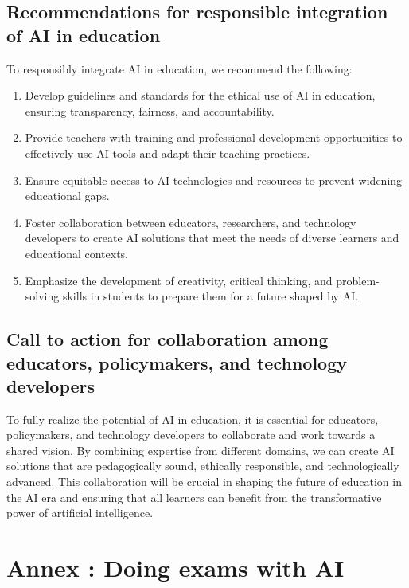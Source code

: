 \documentclass{article}
\begin{document}
\subsection{Recommendations for responsible integration of AI in education}
To responsibly integrate AI in education, we recommend the following:

\begin{enumerate}
    \item Develop guidelines and standards for the ethical use of AI in education, ensuring transparency, fairness, and accountability.
    \item Provide teachers with training and professional development opportunities to effectively use AI tools and adapt their teaching practices.
    \item Ensure equitable access to AI technologies and resources to prevent widening educational gaps.
    \item Foster collaboration between educators, researchers, and technology developers to create AI solutions that meet the needs of diverse learners and educational contexts.
    \item Emphasize the development of creativity, critical thinking, and problem-solving skills in students to prepare them for a future shaped by AI.
\end{enumerate}

\subsection{Call to action for collaboration among educators, policymakers, and technology developers}
To fully realize the potential of AI in education, it is essential for educators, policymakers, and technology developers to collaborate and work towards a shared vision. By combining expertise from different domains, we can create AI solutions that are pedagogically sound, ethically responsible, and technologically advanced. This collaboration will be crucial in shaping the future of education in the AI era and ensuring that all learners can benefit from the transformative power of artificial intelligence.

\section*{Annex : Doing exams with AI}

\cite{einstein}




\end{document}
